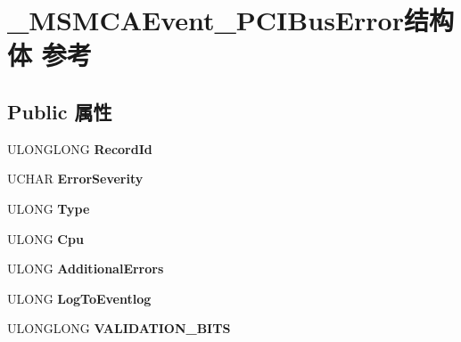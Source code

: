 \hypertarget{struct___m_s_m_c_a_event___p_c_i_bus_error}{}\section{\+\_\+\+M\+S\+M\+C\+A\+Event\+\_\+\+P\+C\+I\+Bus\+Error结构体 参考}
\label{struct___m_s_m_c_a_event___p_c_i_bus_error}
\subsection*{Public 属性}
\begin{DoxyCompactItemize}
\item 
\mbox{\label{struct___m_s_m_c_a_event___p_c_i_bus_error_a397d96db6551a91b06e4d0b0f0d22f5a}} 
U\+L\+O\+N\+G\+L\+O\+NG {\bfseries Record\+Id}
\item 
\mbox{\label{struct___m_s_m_c_a_event___p_c_i_bus_error_afe8fdfb5399cf82d7712a4adc5a451aa}} 
U\+C\+H\+AR {\bfseries Error\+Severity}
\item 
\mbox{\label{struct___m_s_m_c_a_event___p_c_i_bus_error_ab612d205ab026331e8fc17c25512ace6}} 
U\+L\+O\+NG {\bfseries Type}
\item 
\mbox{\label{struct___m_s_m_c_a_event___p_c_i_bus_error_a01e4cde8a6566a4f218579585243630f}} 
U\+L\+O\+NG {\bfseries Cpu}
\item 
\mbox{\label{struct___m_s_m_c_a_event___p_c_i_bus_error_a43e3161bc450461c70a89909891f8bb6}} 
U\+L\+O\+NG {\bfseries Additional\+Errors}
\item 
\mbox{\label{struct___m_s_m_c_a_event___p_c_i_bus_error_a4b043c5610fdf43b4913eeffb484ca46}} 
U\+L\+O\+NG {\bfseries Log\+To\+Eventlog}
\item 
\mbox{\label{struct___m_s_m_c_a_event___p_c_i_bus_error_ab858810c35655130b695700d0a1f7a33}} 
U\+L\+O\+N\+G\+L\+O\+NG {\bfseries V\+A\+L\+I\+D\+A\+T\+I\+O\+N\+\_\+\+B\+I\+TS}

\end{DoxyCompactItemize}
